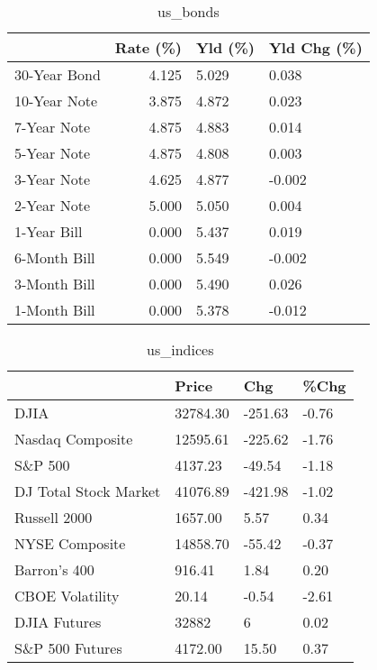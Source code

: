 \documentclass{article}%
\begin{document}
\begin{table}[htbp]%
\caption{us\_bonds}%
\centering%
\begin{adjustbox}{width=1\textwidth}%
\begin{tabular}{lrll}
\toprule
             &  Rate (\%) & Yld (\%) & Yld Chg (\%) \\
\midrule
30-Year Bond &     4.125 &   5.029 &       0.038 \\
10-Year Note &     3.875 &   4.872 &       0.023 \\
 7-Year Note &     4.875 &   4.883 &       0.014 \\
 5-Year Note &     4.875 &   4.808 &       0.003 \\
 3-Year Note &     4.625 &   4.877 &      -0.002 \\
 2-Year Note &     5.000 &   5.050 &       0.004 \\
 1-Year Bill &     0.000 &   5.437 &       0.019 \\
6-Month Bill &     0.000 &   5.549 &      -0.002 \\
3-Month Bill &     0.000 &   5.490 &       0.026 \\
1-Month Bill &     0.000 &   5.378 &      -0.012 \\
\bottomrule
\end{tabular}
%
\end{adjustbox}%
\end{table}

%


\begin{table}[htbp]%
\caption{us\_indices}%
\centering%
\begin{adjustbox}{width=1\textwidth}%
\begin{tabular}{llll}
\toprule
                      &    Price &     Chg &  \%Chg \\
\midrule
                 DJIA & 32784.30 & -251.63 & -0.76 \\
     Nasdaq Composite & 12595.61 & -225.62 & -1.76 \\
              S\&P 500 &  4137.23 &  -49.54 & -1.18 \\
DJ Total Stock Market & 41076.89 & -421.98 & -1.02 \\
         Russell 2000 &  1657.00 &    5.57 &  0.34 \\
       NYSE Composite & 14858.70 &  -55.42 & -0.37 \\
         Barron's 400 &   916.41 &    1.84 &  0.20 \\
      CBOE Volatility &    20.14 &   -0.54 & -2.61 \\
         DJIA Futures &    32882 &       6 &  0.02 \\
      S\&P 500 Futures &  4172.00 &   15.50 &  0.37 \\
\bottomrule
\end{tabular}
%
\end{adjustbox}%
\end{table}
\end{document}
